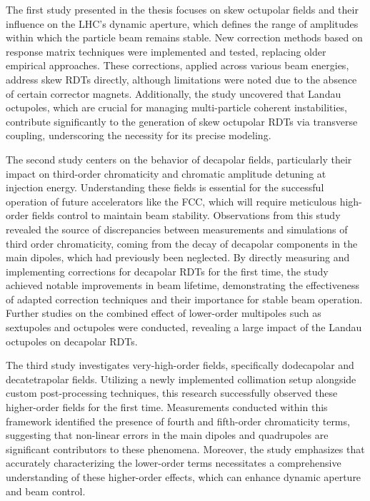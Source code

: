 \documentclass{article}
\begin{document}
The first study presented in the thesis focuses on skew octupolar fields and their influence on the
LHC's dynamic aperture, which defines the range of amplitudes within which the particle beam remains
stable. New correction methods based on response matrix techniques were implemented and tested,
replacing older empirical approaches. These corrections, applied across various beam energies,
address skew RDTs directly, although limitations were noted due to the absence of certain corrector
magnets. Additionally, the study uncovered that Landau octupoles, which are crucial for managing
multi-particle coherent instabilities, contribute significantly to the generation of skew octupolar
RDTs via transverse coupling, underscoring the necessity for its precise modeling.

The second study centers on the behavior of decapolar fields, particularly their impact on
third-order chromaticity and chromatic amplitude detuning at injection energy. Understanding these
fields is essential for the successful operation of future accelerators like the FCC, which will
require meticulous high-order fields control to maintain beam stability. Observations from this
study revealed the source of discrepancies between measurements and simulations of third order
chromaticity, coming from the decay of decapolar components in the main dipoles, which had
previously been neglected. By directly measuring and implementing corrections for decapolar RDTs
for the first time, the study achieved notable improvements in beam lifetime, demonstrating the
effectiveness of adapted correction techniques and their importance for stable beam operation.
Further studies on the combined effect of lower-order multipoles such as sextupoles and octupoles
were conducted, revealing a large impact of the Landau octupoles on decapolar RDTs.

The third study investigates very-high-order fields, specifically dodecapolar and decatetrapolar
fields. Utilizing a newly implemented collimation setup alongside custom post-processing techniques,
this research successfully observed these higher-order fields for the first time. Measurements
conducted within this framework identified the presence of fourth and fifth-order chromaticity
terms, suggesting that non-linear errors in the main dipoles and quadrupoles are significant
contributors to these phenomena. Moreover, the study emphasizes that accurately characterizing the
lower-order terms necessitates a comprehensive understanding of these higher-order effects, which
can enhance dynamic aperture and beam control.
\end{document}
